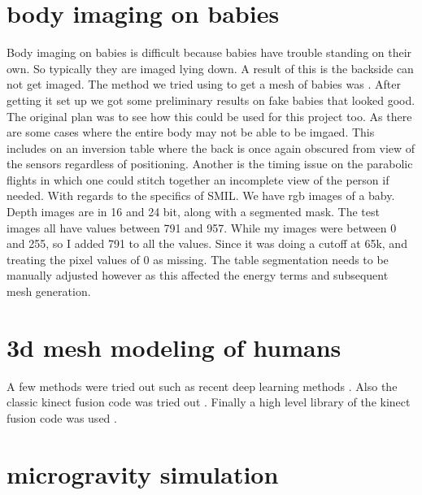 \section{body imaging on babies}
Body imaging on babies is difficult because babies have trouble standing on their own. So typically they are imaged lying down. A result of this is the backside can not get imaged. The method we tried using to get a mesh of babies was . After getting it set up we got some preliminary results on fake babies that looked good. The original plan was to see how this could be used for this project too. As there are some cases where the entire body may not be able to be imgaed. This includes on an inversion table where the back is once again obscured from view of the sensors regardless of positioning. Another is the timing issue on the parabolic flights in which one could stitch together an incomplete view of the person if needed. With regards to the specifics of SMIL. We have rgb images of a baby. Depth images are in 16 and 24 bit, along with a segmented mask. The test images all have values between 791 and 957. While my images were between 0 and 255, so I added 791 to all the values. Since it was doing a cutoff at 65k, and treating the pixel values of 0 as missing. The table segmentation needs to be manually adjusted however as this affected the energy terms and subsequent mesh generation.
\section{3d mesh modeling of humans}
A few methods were tried out such as recent deep learning methods . Also the classic kinect fusion code was tried out . Finally a high level library of the kinect fusion code was used .
\section{microgravity simulation}

